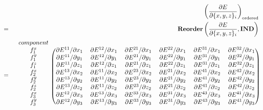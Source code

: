 \documentclass{article}
\begin{document}
\begin{eqnarray}
&& \left(
	\frac{\partial{E}}{\partial{\{x, y, z\}_i}}
\right)_{\mathrm{ordered}} \nonumber \\
& = &
\mathbf{Reorder}\left(
	\frac{\partial{E}}{\partial{\{x, y, z\}_i}}, \mathbf{IND}
\right) \nonumber \\
& = & \begin{blockarray}{ccccccc}
component & & & & & & \\
\begin{block}{c(cccccc)}
f^x_1 &
\partial{E^{11}} / \partial{x_1} & \partial{E^{12}} / \partial{x_1} &
\partial{E^{21}} / \partial{x_1} & \partial{E^{22}} / \partial{x_1} &
\partial{E^{31}} / \partial{x_1} & \partial{E^{32}} / \partial{x_1} \\
f^y_1 &
\partial{E^{11}} / \partial{y_1} & \partial{E^{12}} / \partial{y_1} &
\partial{E^{21}} / \partial{y_1} & \partial{E^{22}} / \partial{y_1} &
\partial{E^{31}} / \partial{y_1} & \partial{E^{32}} / \partial{y_1} \\
f^z_1 &
\partial{E^{11}} / \partial{z_1} & \partial{E^{12}} / \partial{z_1} &
\partial{E^{21}} / \partial{z_1} & \partial{E^{22}} / \partial{z_1} &
\partial{E^{31}} / \partial{z_1} & \partial{E^{32}} / \partial{z_1} \\
%
f^x_2 &
\partial{E^{13}} / \partial{x_2} & \partial{E^{11}} / \partial{x_2} &
\partial{E^{23}} / \partial{x_2} & \partial{E^{21}} / \partial{x_2} &
\partial{E^{41}} / \partial{x_2} & \partial{E^{42}} / \partial{x_2} \\
f^y_2 &
\partial{E^{13}} / \partial{y_2} & \partial{E^{11}} / \partial{y_2} &
\partial{E^{23}} / \partial{y_2} & \partial{E^{21}} / \partial{y_2} &
\partial{E^{41}} / \partial{y_2} & \partial{E^{42}} / \partial{y_2} \\
f^z_2 &
\partial{E^{13}} / \partial{z_2} & \partial{E^{11}} / \partial{z_2} &
\partial{E^{23}} / \partial{z_2} & \partial{E^{21}} / \partial{z_2} &
\partial{E^{41}} / \partial{z_2} & \partial{E^{42}} / \partial{z_2} \\
%
f^x_3 &
\partial{E^{12}} / \partial{x_3} & \partial{E^{13}} / \partial{x_3} &
\partial{E^{33}} / \partial{x_3} & \partial{E^{31}} / \partial{x_3} &
\partial{E^{43}} / \partial{x_3} & \partial{E^{41}} / \partial{x_3} \\
f^y_3 &
\partial{E^{12}} / \partial{y_3} & \partial{E^{13}} / \partial{y_3} &
\partial{E^{33}} / \partial{y_3} & \partial{E^{31}} / \partial{y_3} &
\partial{E^{43}} / \partial{y_3} & \partial{E^{41}} / \partial{y_3} \\

\end{block}
\end{blockarray}
\end{eqnarray}
\end{document}
